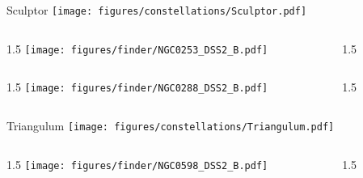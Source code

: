 \documentclass[final]{beamer}
\newlength{\colwidth}
\begin{document}

\begin{frame}[t]{\LARGE Sculptor}
  \centering
  \texttt{[image: figures/constellations/Sculptor.pdf]}
\end{frame}


\begin{frame}[t]{}
  \begin{columns}[T]
    \begin{column}{1.5\colwidth}
      \centering
      \texttt{[image: figures/finder/NGC0253\_DSS2\_B.pdf]}
    \end{column}
    \begin{column}{1.5\colwidth}
      \Large
      
    \end{column}
  \end{columns}
  \vspace{\fill}
  \begin{columns}[T]
    \begin{column}{1.5\colwidth}
      \centering
      \texttt{[image: figures/finder/NGC0288\_DSS2\_B.pdf]}
    \end{column}
    \begin{column}{1.5\colwidth}
      \Large
      
    \end{column}
  \end{columns}
\end{frame}


\begin{frame}[t]{\LARGE Triangulum}
  \centering
  \texttt{[image: figures/constellations/Triangulum.pdf]}
\end{frame}


\begin{frame}[t]{}
  \begin{columns}[T]
    \begin{column}{1.5\colwidth}
      \centering
      \texttt{[image: figures/finder/NGC0598\_DSS2\_B.pdf]}
    \end{column}
    \begin{column}{1.5\colwidth}
      \Large
      
    \end{column}
  \end{columns}
  \vspace{\fill}
\end{frame}
\end{document}
